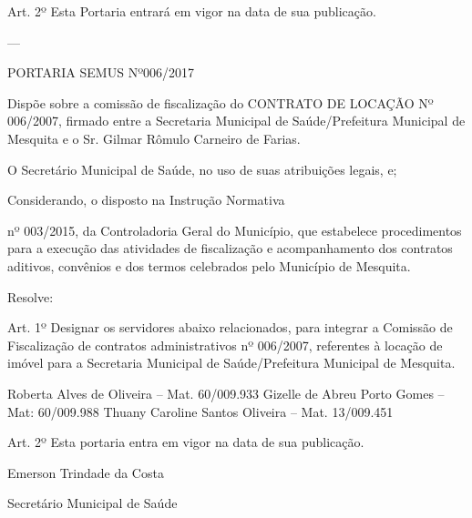 \documentclass{doliberto}
\begin{document}
                                                                                                                                                                                                                                                                                                                                                                                                                                                                                                                                                                                                                                                                                                                                                                                                                                                                                                  
Art.  2º  Esta  Portaria  entrará  em  vigor  na  data  de  sua 
publicação.  

---

PORTARIA SEMUS Nº006/2017 
 

Dispõe sobre a comissão de fiscalização do 
CONTRATO DE LOCAÇÃO Nº 006/2007, firmado entre a 
Secretaria Municipal de Saúde/Prefeitura Municipal de 
Mesquita e o Sr. Gilmar Rômulo Carneiro de Farias. 
 

O  Secretário  Municipal  de  Saúde,  no  uso  de  suas 
atribuições legais, e; 
 
 
Considerando, o disposto na Instrução Normativa 
        
nº  003/2015,  da  Controladoria  Geral  do  Município,  que 
estabelece procedimentos para a execução das atividades de 
fiscalização  e  acompanhamento  dos  contratos  aditivos, 
convênios  e  dos  termos  celebrados  pelo  Município  de 
Mesquita.  
 
 
Resolve:  
 
Art.  1º  Designar  os  servidores  abaixo  relacionados,  para 
integrar  a  Comissão  de  Fiscalização  de  contratos 
administrativos nº 006/2007, referentes à locação de imóvel 
para a Secretaria Municipal de Saúde/Prefeitura Municipal 
de Mesquita. 

 
Roberta Alves de Oliveira – Mat. 60/009.933 
Gizelle de Abreu Porto Gomes – Mat: 60/009.988 
Thuany Caroline Santos Oliveira – Mat. 13/009.451 
 
Art.  2º  Esta  portaria  entra  em  vigor  na  data  de  sua 
publicação. 
 
Emerson Trindade da Costa 

Secretário Municipal de Saúde 
\end{document}
